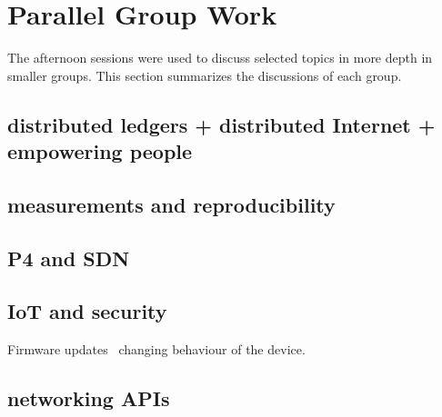\section{Parallel Group Work}\label{sec:parallel-group-work}

The afternoon sessions were used to discuss selected topics in more depth in
smaller groups. This section summarizes the discussions of each group.


\subsection{distributed ledgers + distributed Internet + empowering people}

\subsection{measurements and reproducibility}

\cite{fbai:infocom:2003}

\subsection{P4 and SDN}

\subsection{IoT and security}

Firmware updates~\cite{philips, hp} changing behaviour of the device.

\subsection{networking APIs}
